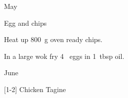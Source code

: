 \begin{menu}{May}
\begin{recipe}{1}{Egg and chips}
\begin{ingredients}
		\end{ingredients}
	
    \begin{instructions}
    \item 
        Heat up
        800~g  oven ready chips.
      \item 
        In a large wok fry
        4~  eggs
        in
        1~tbsp  oil.
      
    \end{instructions}
    \end{recipe}%
  
    \clearpage
    \end{menu}
	
		\begin{menu}{June}
    
    \begin{recipelist}
    
        {\scriptsize[1-2]} Chicken Tagine\\
    \end{recipelist}%
    \begin{recipelist}
    
    \end{recipelist}\par%
  

\end{menu}
